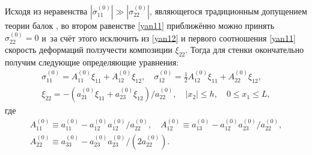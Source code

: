 Исходя из неравенства $|\sigma_{11}^{(0)}|\gg|\sigma_{22}^{(0)}|$, являющегося традиционным допущением теории балок \cite{yan:bib2, yan:bib4, yan:bib6, yan:bib8, yan:bib11},  во втором равенстве \eqref{yan11} приближённо можно принять $\sigma_{22}^{(0)}=0$ и~за счёт этого исключить из \eqref{yan12} и первого соотношения \eqref{yan11} скорость деформаций ползучести композиции $\xi_{22}$.
Тогда для стенки окончательно получим следующие определяющие уравнения:
\begin{equation}
\label{yan13}
\begin{array}{l}
\displaystyle \sigma_{11}^{(0)}=A_{11}^{(0)}\xi_{11}+A_{12}^{(0)}\xi_{12},\quad \sigma_{12}^{(0)}=\frac{1}{2}A_{12}^{(0)}\xi_{11}+A_{22}^{(0)}\xi_{12},
\\ 
\xi_{22}=-(a_{21}^{(0)}\xi_{11}+a_{23}^{(0)}\xi_{12})/a_{22}^{(0)},\quad |x_2|\le h,\quad 0\le x_1\le L, 
\end{array}
\end{equation}
где
\begin{equation}
\label{yan14}
\begin{array}{c}
A_{11}^{(0)}\equiv a_{11}^{(0)}-a_{12}^{(0)}a_{12}^{(0)}/a_{22}^{(0)},\quad A_{12}^{(0)}\equiv a_{13}^{(0)}-a_{12}^{(0)}a_{23}^{(0)}/a_{22}^{(0)}, 
\\[2mm]
A_{22}^{(0)}\equiv a_{33}^{(0)}-a_{23}^{(0)}a_{23}^{(0)}/(2a_{22}^{(0)}). 
 \end{array}
\end{equation}

